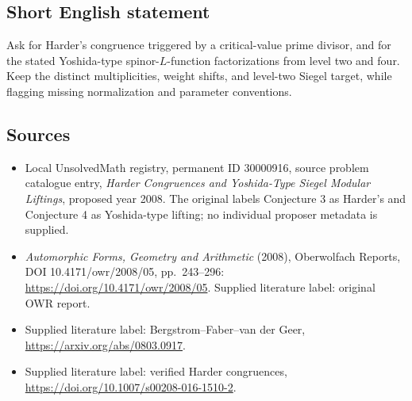 \documentclass[11pt]{article}
\begin{document}
\subsection{Short English statement}
Ask for Harder's congruence triggered by a critical-value prime divisor, and for the stated Yoshida-type spinor-$L$-function factorizations from level two and four. Keep the distinct multiplicities, weight shifts, and level-two Siegel target, while flagging missing normalization and parameter conventions.
\subsection{Sources}
\begin{itemize}\item Local UnsolvedMath registry, permanent ID 30000916, source problem catalogue entry, \emph{Harder Congruences and Yoshida-Type Siegel Modular Liftings}, proposed year 2008. The original labels Conjecture 3 as Harder's and Conjecture 4 as Yoshida-type lifting; no individual proposer metadata is supplied.\item \emph{Automorphic Forms, Geometry and Arithmetic} (2008), Oberwolfach Reports, DOI 10.4171/owr/2008/05, pp.\ 243--296: \url{https://doi.org/10.4171/owr/2008/05}. Supplied literature label: original OWR report.\item Supplied literature label: Bergstrom--Faber--van der Geer, \url{https://arxiv.org/abs/0803.0917}.\item Supplied literature label: verified Harder congruences, \url{https://doi.org/10.1007/s00208-016-1510-2}.\end{itemize}
\end{document}
